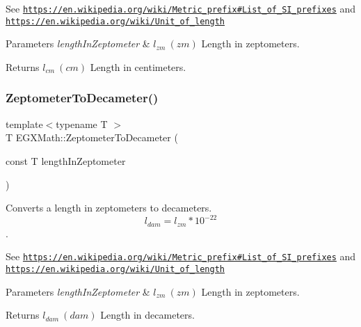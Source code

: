 See \href{https://en.wikipedia.org/wiki/Metric_prefix#List_of_SI_prefixes}{\tt https\+://en.\+wikipedia.\+org/wiki/\+Metric\+\_\+prefix\#\+List\+\_\+of\+\_\+\+S\+I\+\_\+prefixes} and \href{https://en.wikipedia.org/wiki/Unit_of_length}{\tt https\+://en.\+wikipedia.\+org/wiki/\+Unit\+\_\+of\+\_\+length} 
\begin{DoxyParams}{Parameters}
{\em length\+In\+Zeptometer} & $ l_{zm}\ (zm)$ Length in zeptometers. \\
\hline
\end{DoxyParams}
\begin{DoxyReturn}{Returns}
$ l_{cm}\ (cm)$ Length in centimeters. 
\end{DoxyReturn}
\mbox{\label{group___e_g_x_math-_conversions-_length_conversions-_s_i-_zeptometer-_s_i_ga4076e322cf0f16f1eb977409e4f8f251}} 
\subsubsection{\texorpdfstring{Zeptometer\+To\+Decameter()}{ZeptometerToDecameter()}}
{\footnotesize\ttfamily template$<$typename T $>$ \\
T E\+G\+X\+Math\+::\+Zeptometer\+To\+Decameter (\begin{DoxyParamCaption}\item[{const T}]{length\+In\+Zeptometer }\end{DoxyParamCaption})}



Converts a length in zeptometers to decameters. \[ l_{dam}=l_{zm} * 10^{-22} \]. 

See \href{https://en.wikipedia.org/wiki/Metric_prefix#List_of_SI_prefixes}{\tt https\+://en.\+wikipedia.\+org/wiki/\+Metric\+\_\+prefix\#\+List\+\_\+of\+\_\+\+S\+I\+\_\+prefixes} and \href{https://en.wikipedia.org/wiki/Unit_of_length}{\tt https\+://en.\+wikipedia.\+org/wiki/\+Unit\+\_\+of\+\_\+length} 
\begin{DoxyParams}{Parameters}
{\em length\+In\+Zeptometer} & $ l_{zm}\ (zm)$ Length in zeptometers. \\
\hline
\end{DoxyParams}
\begin{DoxyReturn}{Returns}
$ l_{dam}\ (dam)$ Length in decameters. 
\end{DoxyReturn}
\mbox{\label{group___e_g_x_math-_conversions-_length_conversions-_s_i-_zeptometer-_s_i_ga9a25b6696c3f6ed8df86a77e1da46830}} 
